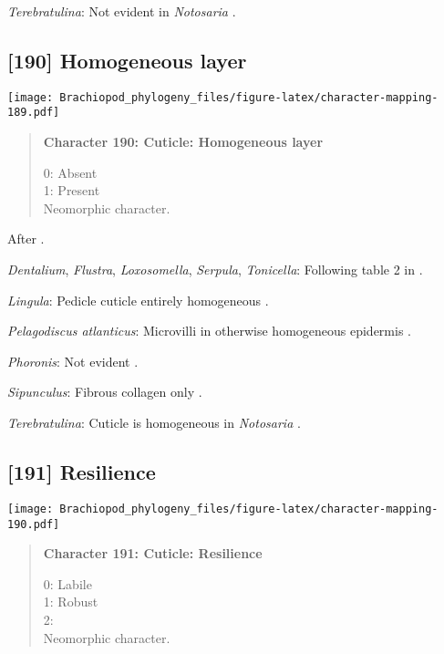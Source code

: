 \documentclass[openany]{book}
\theoremstyle{definition}
\theoremstyle{definition}
\theoremstyle{definition}
\theoremstyle{remark}
\begin{document}
\hypertarget{Terebratulina-coding-189}{}
\emph{Terebratulina}: Not evident in \emph{Notosaria}
\citep{BereiterHahn1984, Williams1997Introduction}.

\subsection*{{[}190{]} Homogeneous layer}\label{homogeneous-layer}

\texttt{[image: Brachiopod\_phylogeny\_files/figure-latex/character-mapping-189.pdf]}

\begin{quote}
\textbf{Character 190: Cuticle: Homogeneous layer}

0: Absent\\
1: Present\\
Neomorphic character.
\end{quote}

After \citet{Borisanova2015}.

\hypertarget{Dentalium-coding-190}{}
\emph{Dentalium}, \emph{Flustra}, \emph{Loxosomella}, \emph{Serpula},
\emph{Tonicella}: Following table 2 in \citet{Borisanova2015}.

\hypertarget{Lingula-coding-190}{}
\emph{Lingula}: Pedicle cuticle entirely homogeneous
\citep{Williams1997Introduction}.

\hypertarget{Pelagodiscus_atlanticus-coding-190}{}
\emph{Pelagodiscus atlanticus}: Microvilli in otherwise homogeneous
epidermis \citep{Williams1997Introduction}.

\hypertarget{Phoronis-coding-190}{}
\emph{Phoronis}: Not evident \citep{BereiterHahn1984}.

\hypertarget{Sipunculus-coding-190}{}
\emph{Sipunculus}: Fibrous collagen only \citep{BereiterHahn1984}.

\hypertarget{Terebratulina-coding-190}{}
\emph{Terebratulina}: Cuticle is homogeneous in \emph{Notosaria}
\citep{BereiterHahn1984, Williams1997Introduction}.

\subsection*{{[}191{]} Resilience}\label{resilience}

\texttt{[image: Brachiopod\_phylogeny\_files/figure-latex/character-mapping-190.pdf]}

\begin{quote}
\textbf{Character 191: Cuticle: Resilience}

0: Labile\\
1: Robust\\
2:\\
Neomorphic character.
\end{quote}
\end{document}
